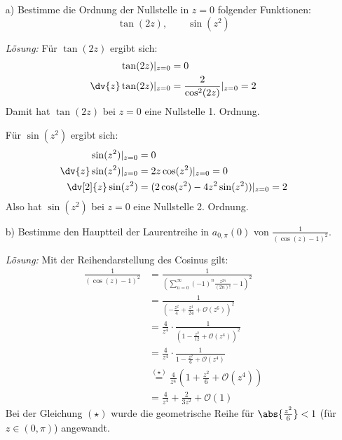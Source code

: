\documentclass[11pt,a4paper]{article}
\theoremstyle{definition} \newtheorem{theo}{Theorem}[section]
\theoremstyle{definition} \newtheorem{defi}{Definition}[section]
\theoremstyle{definition} \newtheorem{cor}{Corollary}[section]
\theoremstyle{definition} \newtheorem{lemmas}{Lemma}[section]
\theoremstyle{definition} \newtheorem{assp}{Assumption}[section]
\theoremstyle{definition} \newtheorem{exam}{Example}[section]
\theoremstyle{definition} \newtheorem{sol}{Lösung}
\begin{document}
\begin{itemize}
	\item[a)] Bestimme die Ordnung der Nullstelle in $z=0$ folgender Funktionen: $$\tan(2z),\qquad \sin(z^{2})$$ 
	
	\textit{Lösung:} Für $\tan(2z)$ ergibt sich:
	\begin{align*}
		\tan(2z)\vert_{z=0}&=0\\
		\dv{z}\tan(2z)\vert_{z=0}&=\frac{2}{\cos^{2}(2z)}\vert_{z=0}=2\\
	\end{align*}
 	Damit hat $\tan(2z)$ bei $z=0$ eine Nullstelle 1. Ordnung.
	
	Für $\sin(z^{2})$ ergibt sich:
	\begin{align*}
		\sin(z^{2})\vert_{z=0}&=0\\
		\dv{z}\sin(z^{2})\vert_{z=0}&=2z\cos(z^{2})\vert_{z=0}=0\\
		\dv[2]{z}\sin(z^{2})&=(2\cos(z^{2})-4z^{2}\sin(z^{2}))\vert_{z=0}=2\\
	\end{align*}
	Also hat $\sin(z^{2})$ bei $z=0$ eine Nullstelle 2. Ordnung.
	
	\item[b)] Bestimme den Hauptteil der Laurentreihe in $a_{0,\pi}(0)$ von $\frac{1}{(\cos(z)-1)^{2}}$.
	
	\textit{Lösung:} Mit der Reihendarstellung des Cosinus gilt:
	\begin{align*}
		\frac{1}{(\cos(z)-1)^{2}}&=\frac{1}{(\sum_{n=0}^{\infty}(-1)^{n}\frac{z^{2n}}{(2n)!} - 1)^{2}}\\
		&=\frac{1}{(-\frac{z^{2}}{4}+\frac{z^{4}}{24}+\mathcal{O}(z^{6}))^{2}}\\
		&=\frac{4}{z^{4}}\cdot\frac{1}{(1-\frac{z^{2}}{12}+\mathcal{O}(z^{4}))^{2}}\\
		&=\frac{4}{z^{4}}\cdot \frac{1}{1-\frac{z^{2}}{6}+\mathcal{O}(z^{4})}\\
		&\overset{(\star)}{=}\frac{4}{z^{4}}\left(1+\frac{z^{2}}{6}+\mathcal{O}(z^{4})\right)\\
		&=\frac{4}{z^{4}}+\frac{2}{3z^{2}}+\mathcal{O}(1)
	\end{align*}
	Bei der Gleichung $(\star)$ wurde die geometrische Reihe für $\abs{\frac{z^{2}}{6}}<1$ (für $z\in (0,\pi)$) angewandt. 
\end{itemize}
\end{document}
